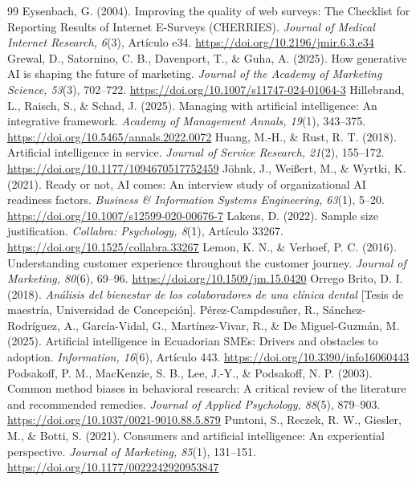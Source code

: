 \documentclass[12pt,letterpaper]{article}
\begin{document}
\begin{thebibliography}{99}
 Eysenbach, G. (2004). Improving the quality of web surveys: The Checklist for Reporting Results of Internet E-Surveys (CHERRIES). \emph{Journal of Medical Internet Research, 6}(3), Artículo e34. \url{https://doi.org/10.2196/jmir.6.3.e34}
 Grewal, D., Satornino, C. B., Davenport, T., \& Guha, A. (2025). How generative AI is shaping the future of marketing. \emph{Journal of the Academy of Marketing Science, 53}(3), 702--722. \url{https://doi.org/10.1007/s11747-024-01064-3}
 Hillebrand, L., Raisch, S., \& Schad, J. (2025). Managing with artificial intelligence: An integrative framework. \emph{Academy of Management Annals, 19}(1), 343--375. \url{https://doi.org/10.5465/annals.2022.0072}
 Huang, M.-H., \& Rust, R. T. (2018). Artificial intelligence in service. \emph{Journal of Service Research, 21}(2), 155--172. \url{https://doi.org/10.1177/1094670517752459}
 Jöhnk, J., Weißert, M., \& Wyrtki, K. (2021). Ready or not, AI comes: An interview study of organizational AI readiness factors. \emph{Business \& Information Systems Engineering, 63}(1), 5--20. \url{https://doi.org/10.1007/s12599-020-00676-7}
 Lakens, D. (2022). Sample size justification. \emph{Collabra: Psychology, 8}(1), Artículo 33267. \url{https://doi.org/10.1525/collabra.33267}
 Lemon, K. N., \& Verhoef, P. C. (2016). Understanding customer experience throughout the customer journey. \emph{Journal of Marketing, 80}(6), 69--96. \url{https://doi.org/10.1509/jm.15.0420}
 Orrego Brito, D. I. (2018). \emph{Análisis del bienestar de los colaboradores de una clínica dental} [Tesis de maestría, Universidad de Concepción].
 Pérez-Campdesuñer, R., Sánchez-Rodríguez, A., García-Vidal, G., Martínez-Vivar, R., \& De Miguel-Guzmán, M. (2025). Artificial intelligence in Ecuadorian SMEs: Drivers and obstacles to adoption. \emph{Information, 16}(6), Artículo 443. \url{https://doi.org/10.3390/info16060443}
 Podsakoff, P. M., MacKenzie, S. B., Lee, J.-Y., \& Podsakoff, N. P. (2003). Common method biases in behavioral research: A critical review of the literature and recommended remedies. \emph{Journal of Applied Psychology, 88}(5), 879--903. \url{https://doi.org/10.1037/0021-9010.88.5.879}
 Puntoni, S., Reczek, R. W., Giesler, M., \& Botti, S. (2021). Consumers and artificial intelligence: An experiential perspective. \emph{Journal of Marketing, 85}(1), 131--151. \url{https://doi.org/10.1177/0022242920953847}

\end{thebibliography}
\end{document}
